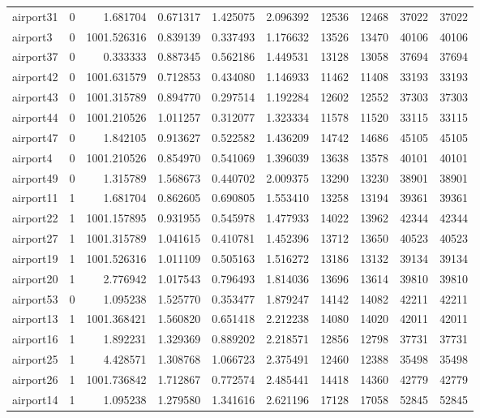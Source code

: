\begin{longtable}{|l|r|r|r|r|r|r|r|r|r|}
airport31 & 0 & 1.681704 & 0.671317 & 1.425075 & 2.096392 & 12536 & 12468 & 37022 & 37022 \\
airport3 & 0 & 1001.526316 & 0.839139 & 0.337493 & 1.176632 & 13526 & 13470 & 40106 & 40106 \\
airport37 & 0 & 0.333333 & 0.887345 & 0.562186 & 1.449531 & 13128 & 13058 & 37694 & 37694 \\
airport42 & 0 & 1001.631579 & 0.712853 & 0.434080 & 1.146933 & 11462 & 11408 & 33193 & 33193 \\
airport43 & 0 & 1001.315789 & 0.894770 & 0.297514 & 1.192284 & 12602 & 12552 & 37303 & 37303 \\
airport44 & 0 & 1001.210526 & 1.011257 & 0.312077 & 1.323334 & 11578 & 11520 & 33115 & 33115 \\
airport47 & 0 & 1.842105 & 0.913627 & 0.522582 & 1.436209 & 14742 & 14686 & 45105 & 45105 \\
airport4 & 0 & 1001.210526 & 0.854970 & 0.541069 & 1.396039 & 13638 & 13578 & 40101 & 40101 \\
airport49 & 0 & 1.315789 & 1.568673 & 0.440702 & 2.009375 & 13290 & 13230 & 38901 & 38901 \\
airport11 & 1 & 1.681704 & 0.862605 & 0.690805 & 1.553410 & 13258 & 13194 & 39361 & 39361 \\
airport22 & 1 & 1001.157895 & 0.931955 & 0.545978 & 1.477933 & 14022 & 13962 & 42344 & 42344 \\
airport27 & 1 & 1001.315789 & 1.041615 & 0.410781 & 1.452396 & 13712 & 13650 & 40523 & 40523 \\
airport19 & 1 & 1001.526316 & 1.011109 & 0.505163 & 1.516272 & 13186 & 13132 & 39134 & 39134 \\
airport20 & 1 & 2.776942 & 1.017543 & 0.796493 & 1.814036 & 13696 & 13614 & 39810 & 39810 \\
airport53 & 0 & 1.095238 & 1.525770 & 0.353477 & 1.879247 & 14142 & 14082 & 42211 & 42211 \\
airport13 & 1 & 1001.368421 & 1.560820 & 0.651418 & 2.212238 & 14080 & 14020 & 42011 & 42011 \\
airport16 & 1 & 1.892231 & 1.329369 & 0.889202 & 2.218571 & 12856 & 12798 & 37731 & 37731 \\
airport25 & 1 & 4.428571 & 1.308768 & 1.066723 & 2.375491 & 12460 & 12388 & 35498 & 35498 \\
airport26 & 1 & 1001.736842 & 1.712867 & 0.772574 & 2.485441 & 14418 & 14360 & 42779 & 42779 \\
airport14 & 1 & 1.095238 & 1.279580 & 1.341616 & 2.621196 & 17128 & 17058 & 52845 & 52845 \\

\end{longtable}
